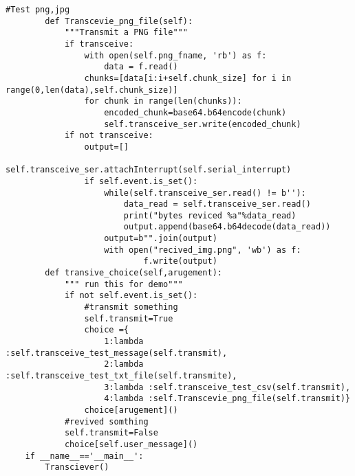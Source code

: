 \begin{lstlisting}[style=mystyle,caption={Code for Radio module}]
		#Test png,jpg
		def Transcevie_png_file(self):
			"""Transmit a PNG file"""
			if transceive:
				with open(self.png_fname, 'rb') as f:
					data = f.read()
				chunks=[data[i:i+self.chunk_size] for i in range(0,len(data),self.chunk_size)]
				for chunk in range(len(chunks)):
					encoded_chunk=base64.b64encode(chunk)
					self.transceive_ser.write(encoded_chunk)
			if not transceive:
				output=[]
				self.transceive_ser.attachInterrupt(self.serial_interrupt)
				if self.event.is_set():
					while(self.transceive_ser.read() != b''):
						data_read = self.transceive_ser.read()
						print("bytes reviced %a"%data_read)
						output.append(base64.b64decode(data_read))
					output=b"".join(output)
					with open("recived_img.png", 'wb') as f:
							f.write(output)
		def transive_choice(self,arugement):
			""" run this for demo"""
			if not self.event.is_set():
				#transmit something
				self.transmit=True
				choice ={
					1:lambda :self.transceive_test_message(self.transmit),
					2:lambda :self.transceive_test_txt_file(self.transmite),
					3:lambda :self.transceive_test_csv(self.transmit),
					4:lambda :self.Transcevie_png_file(self.transmit)}
				choice[arugement]()
			#revived somthing
			self.transmit=False
			choice[self.user_message]()
	if __name__=='__main__':
		Transciever()
	
\end{lstlisting}